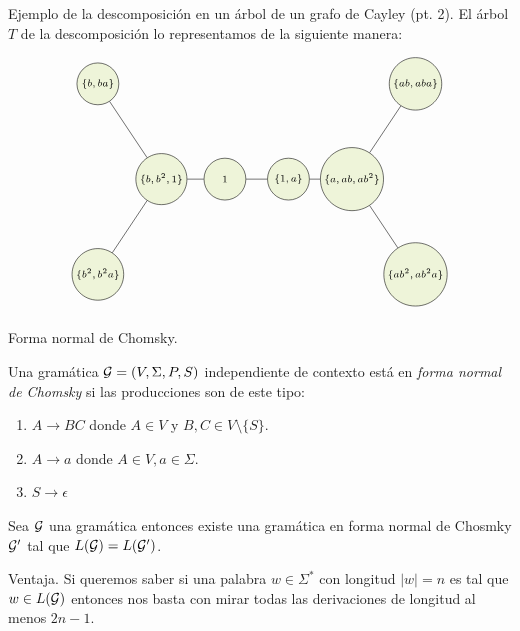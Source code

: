 \documentclass[aspectratio=169, 11pt]{beamer}
\begin{document}
	\begin{frame}[fragile]{Ejemplo de la descomposición en un árbol de un grafo de Cayley (pt. 2).}
		El árbol $T$ de la descomposición lo representamos de la siguiente manera:

	\[
			\begin{tikzpicture}[scale=0.8, V/.style = {circle, draw,align= center, minimum size=0.5cm,
			minimum size=3em,inner sep=2,
			fill=applegreen!15,font=\scriptsize	},fill fraction/.style={path picture={
				\fill[#1] 
				(path picture bounding box.south) rectangle
				(path picture bounding box.north west);
		}},
		fill fraction/.default=gray!50
		]
		\node[align=center] at (2, -6) {};
		\begin{scope}[nodes=V,xshift=4.5cm, yshift=-4cm]
			\node (1) at (0,0)  {$\{ b,b^2,1 \}$};
			\node (2) at (2,0)  {$1$};
			\node (3) at (4,0)  {$\{ 1,a \}$};
			\node (4) at (-2,3)     {$\{ b,ba \}$};
			\node (5) at (-2,-3)   {$\{b^2,b^2a\}$};
			\node (6) at (6,0)  {$\{ a,ab,ab^2 \}$};
			
			\node (9) at (8,3)  {$\{ab,aba\}$};
			\node (10) at (8,-3)  {$\{ ab^2, ab^2a \}$};
		\end{scope}
		
		
		\draw (1) edge[-] (2);
		\draw (2) edge[-] (3);
		\draw (1) edge[-] (5);
		\draw (1) edge[-] (4);
		\draw (3) edge[-] (6);
		\draw (6) edge[-] (9);
		\draw (6) edge[-] (10);
	\end{tikzpicture}
	\]
	\end{frame}

	\begin{frame}[fragile]{Forma normal de Chomsky.}
		\begin{deff}
			Una gramática ${\cal G} = (V, \Sigma, P, S)$ independiente de contexto está en \emph{forma normal de Chomsky} si las producciones son de este tipo:
			\begin{enumerate}
				\item $A \to BC$ donde $A\in V$ y $B,C \in V \setminus \{ S \}$.
				\item $A \to a$ donde $A \in V, a \in \Sigma$.
				\item $S \to \epsilon$ 
			\end{enumerate}
		\end{deff}
		\begin{teo}
			Sea ${\cal G}$ una gramática \ic{} entonces existe una gramática \ic{} en forma normal de Chosmky ${\cal G}'$ tal que $L({\cal G}) = L({\cal G}')$.
		\end{teo}

		\begin{alertblock}{Ventaja.}
			Si queremos saber si una palabra $w \in \Sigma^{*}$ con longitud $|w| = n$ es tal que $w \in L({\cal G})$ entonces nos basta con mirar todas las derivaciones de longitud al menos $2n-1$.
		\end{alertblock}
	\end{frame}
\end{document}
